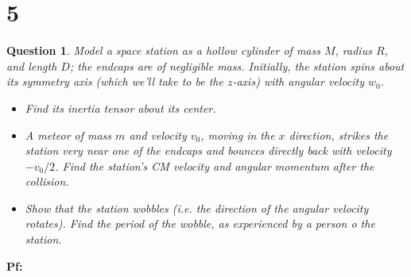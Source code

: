 \documentclass{article}
\newtheorem{question}{Question}
\begin{document}
\section*{5}
\begin{question}\label{q5}
    Model a space station as a hollow cylinder of mass $M$, radius $R$, and length $D$; the endcaps are of negligible mass. Initially, the station spins about its symmetry axis (which we'll take to be the $z$-axis) with angular velocity $w_0$.
    \begin{itemize}
        \item[(a)] Find its inertia tensor about its center.
        \item[(b)] A meteor of mass $m$ and velocity $v_0$, moving in the $x$ direction, strikes the station very near one of the endcaps and bounces directly back with velocity $-v_0/2$. Find the station's CM velocity and angular momentum after the collision.
        \item[(c)] Show that the station wobbles (i.e. the direction of the angular velocity rotates). Find the period of the wobble, as experienced by a person o the station.  
    \end{itemize}
\end{question}

\textbf{Pf:}
\end{document}
